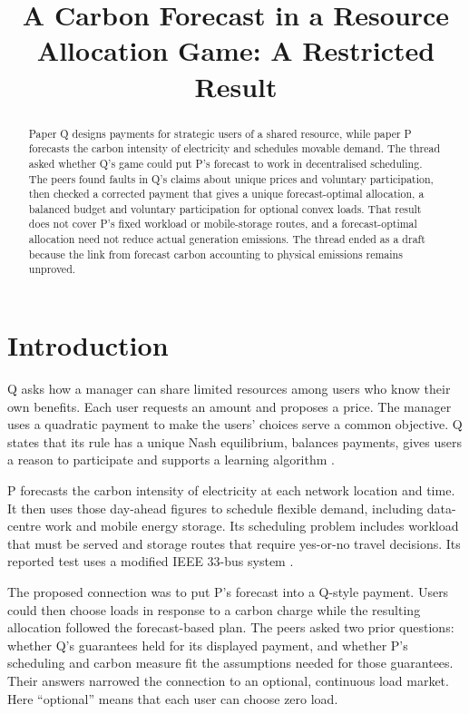\documentclass{article}
\title{A Carbon Forecast in a Resource Allocation Game: A Restricted Result}
\begin{document}
\maketitle

\begin{abstract}
Paper Q designs payments for strategic users of a shared resource, while paper P forecasts the carbon
intensity of electricity and schedules movable demand. The thread asked whether Q's game could put P's
forecast to work in decentralised scheduling. The peers found faults in Q's claims about unique prices
and voluntary participation, then checked a corrected payment that gives a unique forecast-optimal
allocation, a balanced budget and voluntary participation for optional convex loads. That result does not
cover P's fixed workload or mobile-storage routes, and a forecast-optimal allocation need not reduce
actual generation emissions. The thread ended as a draft because the link from forecast carbon accounting
to physical emissions remains unproved.
\end{abstract}

\section{Introduction}

Q asks how a manager can share limited resources among users who know their own benefits. Each user
requests an amount and proposes a price. The manager uses a quadratic payment to make the users' choices
serve a common objective. Q states that its rule has a unique Nash equilibrium, balances payments, gives
users a reason to participate and supports a learning algorithm \cite{Q}.

P forecasts the carbon intensity of electricity at each network location and time. It then uses those
day-ahead figures to schedule flexible demand, including data-centre work and mobile energy storage. Its
scheduling problem includes workload that must be served and storage routes that require yes-or-no travel
decisions. Its reported test uses a modified IEEE 33-bus system \cite{P}.

The proposed connection was to put P's forecast into a Q-style payment. Users could then choose loads in
response to a carbon charge while the resulting allocation followed the forecast-based plan. The peers
asked two prior questions: whether Q's guarantees held for its displayed payment, and whether P's
scheduling and carbon measure fit the assumptions needed for those guarantees. Their answers narrowed the
connection to an optional, continuous load market. Here ``optional'' means that each user can choose zero
load.
\end{document}

